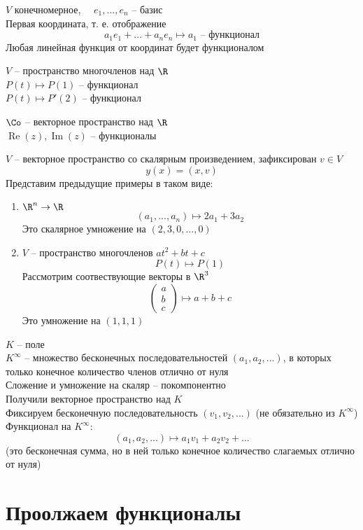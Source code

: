 \begin{exmpls}
	\item $ V $ конечномерное, $ \quad e_1, ..., e_n $ -- базис \\
	Первая координата, т. е. отображение
	$$ a_1e_1 + ... + a_ne_n \mapsto a_1 \text{ -- функционал} $$
	Любая линейная функция от координат будет функционалом
	\item $ V $ -- пространство многочленов над $ \R $ \\
	$ P(t) \mapsto P(1) $ -- функционал \\
	$ P(t) \mapsto P'(2) $ -- функционал
	\item $ \Co $ -- векторное пространство над $ \R $ \\
	$ \operatorname{Re}(z), \operatorname{Im}(z) $ -- функционалы
	\item $ V $ -- векторное пространство со скалярным произведением, зафиксирован $ v \in V $
	$$ y(x) = (x, v) $$
	Представим предыдущие примеры в таком виде:
	\begin{enumerate}
		\item $ \R^n \to \R $
		$$ (a_1, ..., a_n) \mapsto 2a_1 + 3a_2 $$
		Это скалярное умножение на $ (2, 3, 0, ..., 0) $
		\item $ V $ -- пространство многочленов $ at^2 + bt + c $
		$$ P(t) \mapsto P(1) $$
		Рассмотрим соотвествующие векторы в $ \R^3 $
		$$
		\begin{pmatrix}
			a \\
			b \\
			c
		\end{pmatrix} \mapsto a + b + c $$
		Это умножение на $ (1, 1, 1) $
	\end{enumerate}
	\item $ K $ -- поле \\
	$ K^\infty $ -- множество бесконечных последовательностей $ (a_1, a_2, ...) $, в которых только конечное количество членов отлично от нуля \\
	Сложение и умножение на скаляр -- покомпонентно \\
	Получили векторное пространство над $ K $ \\
	Фиксируем бесконечную последовательность $ (v_1, v_2, ...) $ (не обязательно из $ K^\infty $) \\
	Функционал на $ K^\infty $:
	$$ (a_1, a_2, ...) \mapsto a_1v_1 + a_2v_2 + ... $$
	(это бесконечная сумма, но в ней только конечное количество слагаемых отлично от нуля)
\end{exmpls}


\section{Проолжаем функционалы}

